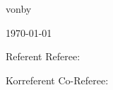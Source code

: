 \begin{titlepage}
\begin{center}
{von}{by}
\par\end{center}

\begin{center}
\theAuthor
\par\end{center}

\begin{center}
\today
\par\end{center}

\vspace{1.5cm}

{Referent}
{Referee}: \theFirstReferee

{Korreferent}
{Co-Referee}: \theSecondReferee

\end{titlepage}


\thispagestyle{empty}

\cleardoublepage

\printGenerativeAIDeclaration

\printGenderDisclaimer

\printDeclarationOfIndependence

\clearpage
\mbox{}\thispagestyle{empty}

